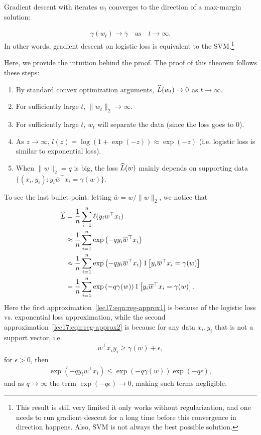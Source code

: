\begin{theorem}
	Gradient descent with iterates $w_t$ converges to the direction of a max-margin solution:
	
	\begin{align}
		\gamma(w_t) \rightarrow \overline{\gamma} \quad  \text{as} \quad t \rightarrow \infty.
	\end{align}
	In other words, gradient descent on logistic loss is equivalent to the SVM.\footnote{This result is still very limited it only works without regularization, and one needs to run gradient descent for a long time before this convergence in direction happens. Also, SVM is not always the best possible solution.}
\end{theorem}

Here, we provide the intuition behind the proof. The proof of this theorem follows these steps:
\begin{enumerate}
	\item By standard convex optimization arguments, $\widehat{L} (w_t) \rightarrow 0$ as $t\rightarrow \infty$.
	\item For sufficiently large $t$, $\|w_t\|_2 \rightarrow \infty$.
	\item For sufficiently large $t$, $w_t$ will separate the data (since the loss goes to 0).
	\item As $z \rightarrow \infty$, $l(z) = \log(1 + \exp (-z)) \approx \exp(-z)$ (i.e. logistic loss is similar to exponential loss). 
	\item When $\|w\|_2 = q $ is big, the loss $\widehat{L}(w)$ mainly depends on supporting data $\{(x_i, y_i) : y_i\overline{w}^\top x_i = \gamma(w)\}$.
\end{enumerate}

To see the last bullet point: letting $\overline{w} = w / \|w\|_2$, we notice that 
\begin{align}
	\widehat{L} &= \frac{1}{n} \sum_{i=1}^{n} \ell(y_i w^\top x_i)\\
	&\approx \frac{1}{n} \sum_{i=1}^{n} \exp\left(-qy_i \overline{w}^\top x_i\right) \label{lec17:eqn:reg-approx1} \\
	&\approx \frac{1}{n} \sum_{i=1}^{n} \exp\left(-qy_i \overline{w}^\top x_i\right) 1\left[y_i \overline{w}^\top x_i = \gamma(w)\right] \label{lec17:eqn:reg-approx2} \\
	&= \frac{1}{n} \sum_{i=1}^{n} \exp\left(-q\gamma(w) \right) 1\left[y_i \overline{w}^\top x_i = \gamma(w)\right]. \label{lec17:eqn:reg-approx3}
\end{align}
Here the first approximation~\eqref{lec17:eqn:reg-approx1} is because of the logistic loss vs. exponential loss approximation, while the second approximation~\eqref{lec17:eqn:reg-approx2} is because for any data $x_i, y_i$ that is not a support vector, i.e.
\begin{align}
	\overline{w}^\top x_i y_i \ge \gamma(w)+\epsilon,
\end{align}
for $\epsilon>0$, then
\begin{align}
	\exp(-qy_i\overline{w}^\top x_i) \le \exp(-q\gamma(w))\exp(-q\epsilon),
\end{align}
and as $q\rightarrow \infty$ the term $\exp(-q\epsilon)\rightarrow 0$, making such terms negligible.

